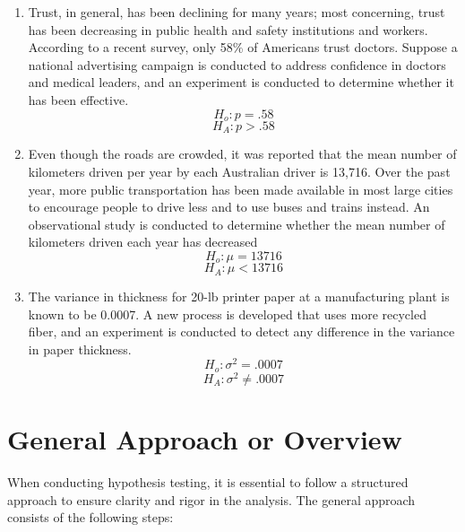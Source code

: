 \documentclass{report}
\begin{document}
\begin{enumerate}[label=(\alph*)]
  \item Trust, in general, has been declining for many years; most concerning, trust has been decreasing in public health and safety institutions and workers. According to a recent survey, only 58\% of Americans trust doctors. Suppose a national advertising campaign is conducted to address confidence in doctors and medical leaders, and an experiment is conducted to determine whether it has been effective.
  $$ H_o : p = .58$$
  $$ H_A : p > .58$$
  \item Even though the roads are crowded, it was reported that the mean number of kilometers
driven per year by each Australian driver is 13,716. Over the past year, more public
transportation has been made available in most large cities to encourage people to drive
less and to use buses and trains instead. An observational study is conducted to
determine whether the mean number of kilometers driven each year has decreased
  $$ H_o : \mu = 13716$$
  $$ H_A : \mu < 13716$$
\item The variance in thickness for 20-lb printer paper at a manufacturing plant is known to be
0.0007. A new process is developed that uses more recycled fiber, and an experiment is
conducted to detect any difference in the variance in paper thickness.
  $$ H_o : \sigma^2 = .0007$$
  $$ H_A : \sigma^2 \neq .0007$$
\end{enumerate}
  \bigbreak \noindent
  \bigbreak \noindent
  \section{General Approach or Overview}
When conducting hypothesis testing, it is essential to follow a structured approach to ensure clarity and rigor in the analysis. The general approach consists of the following steps:
\end{document}
